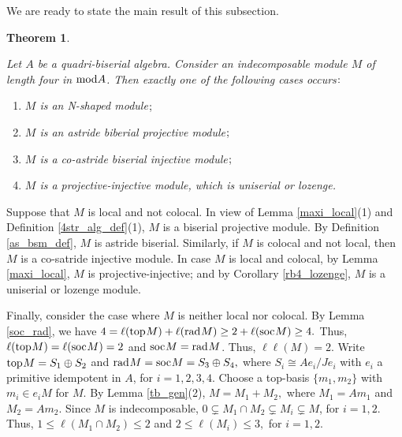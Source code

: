 \documentclass[10pt]{amsart}
\newtheorem{Theo}{Theorem}[subsection]
\theoremstyle{definition}
\newcommand{\mmod}{{\rm mod}}
\newcommand{\rad}{{\rm rad}\hspace{.5pt}}
\newcommand{\soc}{{\rm soc}\hspace{.5pt}}
\newcommand{\ntop}{{\rm top}\hspace{.5pt}}
\newcommand{\hp}{\hspace{.5pt}}
\newcommand{\vp}{\vspace{.5pt}}
\begin{document}
\smallskip 

We are ready to state the main result of this subsection. 

\begin{Theo}\label{l4-4bsa}

Let $A$ be a quadri-biserial algebra. Consider an indecomposable module $M$ of length four in $\mmod A$. Then exactly one of the following cases occurs$\hp:$

\begin{enumerate}[$(1)$]

\vspace{-1pt}

\item $M$ is an N-shaped module$\hp;$


\item $M$ is an astride biberial projective module$\hp;$ %


\item $M$ is a co-astride biserial injective module$\hp;$


\item $M$ is a projective-injective module, which is uniserial or lozenge.

\end{enumerate} \end{Theo}

\vspace{-2pt}

 Suppose that $M$ is local and not colocal. In view of Lemma \ref{maxi_local}(1) and Definition \ref{4str_alg_def}(1), $M$ is a biserial projective module. By Definition \ref{as_bsm_def}, $M$ is astride biserial. Similarly, if $M$ is colocal and not local, then $M$ is a co-satride injective module. In case $M$ is local and colocal, by Lemma \ref{maxi_local}, 
$M$ is projective-injective; and by Corollary \ref{rb4_lozenge}, $M$ is a uniserial or lozenge module. 

Finally, consider the case where $M$ is neither local nor colocal. By Lemma \ref{soc_rad}, we have $4=\ell(\ntop M)+\ell(\rad M)\ge 2 + \ell(\soc M)\ge 4.$
Thus, $\ell(\ntop M)=\ell(\soc M)=2$ and $\soc M=\rad M$. Thus, $\ell\ell(M)=2$. Write $\ntop M= S_1\oplus S_2$ and $\rad M=\soc M= S_3 \oplus S_4,$ where $S_i\cong Ae_i/Je_i$ with $e_i$ a primitive idempotent in $A$, for $i=1, 2, 3, 4.$ Choose a top-basis $\{m_1, m_2\}$ with $m_i\in e_iM$ for $M.$ By Lemma \ref{tb_gen}(2), $M=M_1+M_2,$ where $M_1=Am_1$ and $M_2=Am_2$. %
Since $M$ is indecomposable, $0\subsetneq M_1\cap M_2 \subsetneq M_i\subsetneq M$, for $i=1, 2$. Thus, $1\le \ell( M_1\cap M_2) \le 2$ and $2\le \ell(M_i)\le 3,$ for $i=1, 2.$ 
\end{document}
